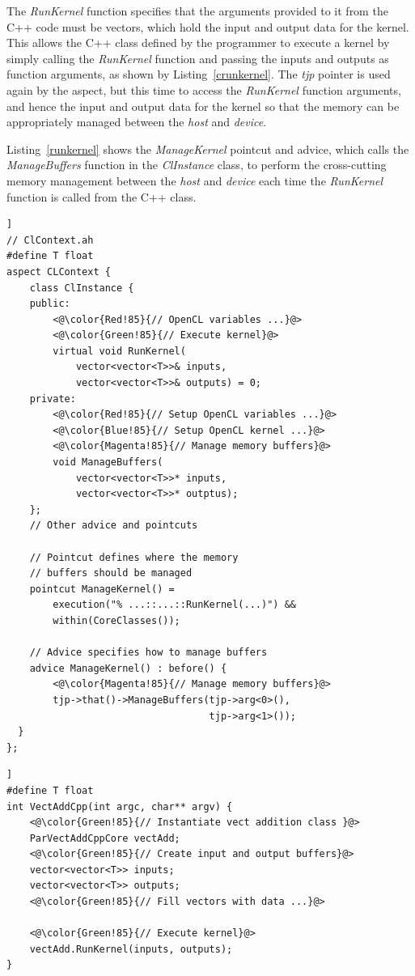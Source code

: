 \documentclass{sig-alternate-05-2015}
\begin{document}
The \textit{RunKernel} function specifies that the arguments provided to it from the
C++ code must be vectors, which hold the input and output data for the
kernel. This
allows the C++ class defined by the programmer to execute a kernel by simply calling the
\textit{RunKernel} function and passing the inputs and outputs as function
arguments, as shown by Listing~\ref{crunkernel}. The \textit{tjp} pointer is 
used again by the aspect, but this time to access the \textit{RunKernel} function arguments, 
and hence the input and output data for the kernel so that the memory can be
appropriately managed between the \textit{host} and \textit{device}.

Listing~\ref{runkernel} shows the \textit{ManageKernel} pointcut and advice,
which calls the \textit{ManageBuffers} function in the \textit{ClInstance}
class, to perform the cross-cutting memory management between the \textit{host} and
\textit{device} each time the \textit{RunKernel} function is called from the C++
class.

\begin{lstlisting}[caption=Abstract aspect components which hide kernel
cross-cutting concerns,label=runkernel,float=[!t]]
// ClContext.ah
#define T float
aspect CLContext {
	class ClInstance {
	public:
		<@\color{Red!85}{// OpenCL variables ...}@>
		<@\color{Green!85}{// Execute kernel}@>
		virtual void RunKernel(
			vector<vector<T>>& inputs,
			vector<vector<T>>& outputs) = 0;
	private:
		<@\color{Red!85}{// Setup OpenCL variables ...}@>
		<@\color{Blue!85}{// Setup OpenCL kernel ...}@>
		<@\color{Magenta!85}{// Manage memory buffers}@>
		void ManageBuffers(
			vector<vector<T>>* inputs,
			vector<vector<T>>* outptus);
	};
	// Other advice and pointcuts 

	// Pointcut defines where the memory 
	// buffers should be managed
	pointcut ManageKernel() = 
		execution("% ...::...::RunKernel(...)") &&
		within(CoreClasses());

	// Advice specifies how to manage buffers
	advice ManageKernel() : before() {
		<@\color{Magenta!85}{// Manage memory buffers}@>
		tjp->that()->ManageBuffers(tjp->arg<0>(),
								   tjp->arg<1>());
  }
};
\end{lstlisting}

\begin{lstlisting}[caption=C++ core class executing a pallel kernel using
C++,label=crunkernel,float=[!t]]
#define T float
int VectAddCpp(int argc, char** argv) {
	<@\color{Green!85}{// Instantiate vect addition class }@>
	ParVectAddCppCore vectAdd;
	<@\color{Green!85}{// Create input and output buffers}@>
	vector<vector<T>> inputs;
	vector<vector<T>> outputs;
	<@\color{Green!85}{// Fill vectors with data ...}@>
  
	<@\color{Green!85}{// Execute kernel}@>
	vectAdd.RunKernel(inputs, outputs);
}
\end{lstlisting}
\end{document}
